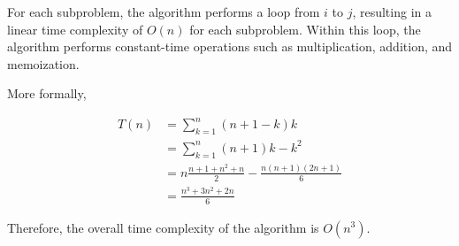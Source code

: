 \documentclass[10pt]{article}
\begin{document}
For each subproblem, the algorithm performs a loop from $i$ to $j$, resulting in a linear time complexity of $O(n)$ for each subproblem. Within this loop, the algorithm performs constant-time operations such as multiplication, addition, and memoization.

More formally,

\begin{align*}T(n) & =  \sum_{k=1}^{n}(n+1-k)k                            \\
                   & =  \sum_{k=1}^{n}(n+1)k - k^2                        \\
                   & =  n\frac{n+1 + n^2 + n}{2} - \frac{n(n+1)(2n+1)}{6} \\
                   & = \frac{n^3 + 3n^2 + 2n}{6}
\end{align*}


Therefore, the overall time complexity of the algorithm is $O(n^3)$.
\end{document}
